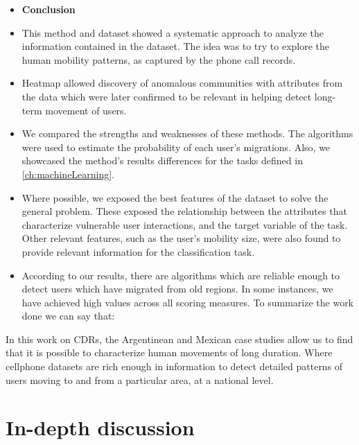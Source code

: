 \begin{itemize}

    \item \textbf{Conclusion}

    \item This method and dataset showed a systematic approach to analyze the information contained in the dataset.
    The idea was to try to explore the human mobility patterns, as captured by the phone call records.

    \item Heatmap allowed discovery of anomalous communities with attributes from the data which were later confirmed to be relevant in helping detect long-term movement of users.

    \item We compared the strengths and weaknesses of these methods.
    The algorithms  were used to estimate the probability of each user's migrations.
    Also, we showcased the method's results differences for the tasks defined in \cref{ch:machineLearning}.

    \item Where possible, we exposed the best features of the dataset to solve the general problem.
    These exposed the relationship between the attributes that characterize vulnerable user interactions, and the target variable of the task.
    Other relevant features, such as the user's mobility size, were also found to provide relevant information for the classification task.

    \item According to our results, there are algorithms which are reliable enough to detect users which have migrated from old regions. In some instances, we have achieved high values across all scoring measures. To summarize the work done we can say that:

\end{itemize}



In this work on CDRs, the Argentinean and Mexican case studies allow us to find that it is possible to characterize human movements of long duration.
Where cellphone datasets are rich enough in information to detect detailed patterns of users moving to and from a particular area, at a national level.



\section{In-depth discussion}



